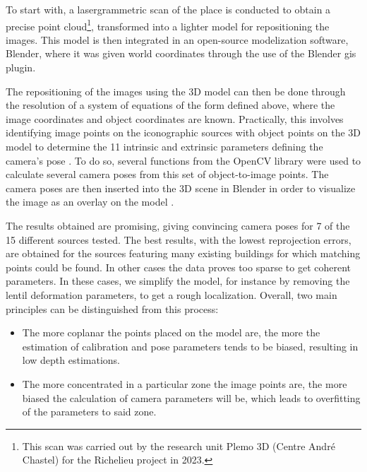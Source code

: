 \documentclass[12pt, a4paper, twocolumn]{article}
\begin{document}
To start with, a lasergrammetric scan of the place is conducted to obtain a precise point cloud\footnote{
    This scan was carried out by the research unit Plemo 3D (Centre André Chastel) for the Richelieu project in 2023.
}, transformed into a lighter model for repositioning the images. This model is then integrated in an open-source modelization software, Blender, where it was given world coordinates through the use of the Blender \acs{gis} plugin.

The repositioning of the images using the 3D model can then be done through the resolution of a system of equations of the form defined above, where the image coordinates and object coordinates are known. Practically, this involves identifying image points on the iconographic sources with object points on the 3D model to determine the 11 intrinsic and extrinsic parameters defining the camera's pose \parencite{deLuca2010}. To do so, several functions from the OpenCV library were used to calculate several camera poses from this set of object-to-image points. The camera poses are  then inserted into the 3D scene in Blender in order to visualize the image as an overlay on the model \parencite{prudhommecolinRepresenterVilleDeveloppement2023}.

The results obtained are  promising, giving convincing camera poses for 7 of the 15 different sources tested. The best results, with the lowest reprojection errors, are  obtained for the sources featuring many existing buildings for which matching points could be found. In other cases the data proves  too sparse to get coherent parameters. In these cases, we  simplify the model, for instance by removing the lentil deformation parameters, to get a rough localization. Overall, two main principles can  be distinguished from this process:
\begin{itemize}
    \item The more coplanar the points placed on the model are, the more the estimation of calibration and pose parameters tends to be biased, resulting in low depth estimations.
    \item The more concentrated in a particular zone the image points are, the more biased the calculation of camera parameters will be, which leads to overfitting of the parameters to said zone.
\end{itemize}
\end{document}
